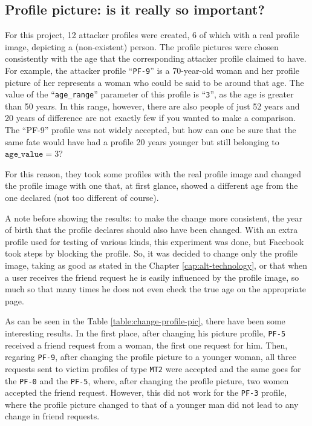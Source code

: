 \subsection{Profile picture: is it really so important?}
\label{cap:discuss-image-profile}
For this project, 12 attacker profiles were created, 6 of which with a real profile image, depicting a (non-existent) person. The profile pictures were chosen consistently with the age that the corresponding attacker profile claimed to have. For example, the attacker profile ``\texttt{PF-9}'' is a 70-year-old woman and her profile picture of her represents a woman who could be said to be around that age. The value of the ``\texttt{age\_range}'' parameter of this profile is ``\texttt{3}'', as the age is greater than 50 years. In this range, however, there are also people of just 52 years and 20 years of difference are not exactly few if you wanted to make a comparison. The ``PF-9'' profile was not widely accepted, but how can one be sure that the same fate would have had a profile 20 years younger but still belonging to $\texttt{age\_value} = 3$?\par \noindent For this reason, they took some profiles with the real profile image and changed the profile image with one that, at first glance, showed a different age from the one declared (not too different of course).\par \noindent A note before showing the results: to make the change more consistent, the year of birth that the profile declares should also have been changed. With an extra profile used for testing of various kinds, this experiment was done, but Facebook took steps by blocking the profile. So, it was decided to change only the profile image, taking as good as stated in the Chapter \ref{cap:alt-technology}, or that when a user receives the friend request he is easily influenced by the profile image, so much so that many times he does not even check the true age on the appropriate page.
\par \noindent As can be seen in the Table \ref{table:change-profile-pic}, there have been some interesting results. In the first place, after changing his picture profile, \texttt{PF-5} received a friend request from a woman, the first one request for him. Then, regaring \texttt{PF-9}, after changing the profile picture to a younger woman, all three requests sent to victim profiles of type \texttt{MT2} were accepted and the same goes for the \texttt{PF-0} and the \texttt{PF-5}, where, after changing the profile picture, two women accepted the friend request. However, this did not work for the \texttt{PF-3} profile, where the profile picture changed to that of a younger man did not lead to any change in friend requests.
